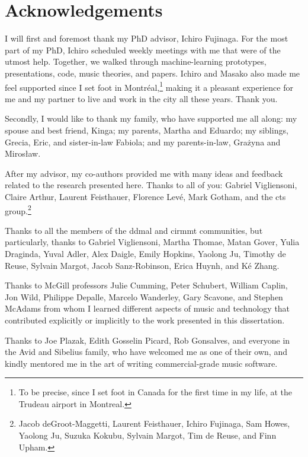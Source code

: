 \chapter*{Acknowledgements}
\label{chap:acknowledgements}

I will first and foremost thank my PhD advisor, Ichiro
Fujinaga. For the most part of my PhD, Ichiro scheduled
weekly meetings with me that were of the utmost help.
Together, we walked through machine-learning prototypes,
presentations, code, music theories, and papers. Ichiro and
Masako also made me feel supported since I set foot in
Montr\'eal,\footnote{To be precise, since I set foot in
Canada for the first time in my life, at the Trudeau airport
in Montreal.} making it a pleasant experience for me and my
partner to live and work in the city all these years. Thank
you.

Secondly, I would like to thank my family, who have
supported me all along: my spouse and best friend, Kinga; my
parents, Martha and Eduardo; my siblings, Grecia, Eric, and
sister-in-law Fabiola; and my parents-in-law, Gra\.zyna and
Miros\l{}aw.

After my advisor, my co-authors provided me with many ideas
and feedback related to the research presented here. Thanks
to all of you: Gabriel Vigliensoni, Claire Arthur, Laurent
Feisthauer, Florence Lev\'e, Mark Gotham, and the \gls{cts}
group.\footnote{Jacob deGroot-Maggetti, Laurent Feisthauer,
Ichiro Fujinaga, Sam Howes, Yaolong Ju, Suzuka Kokubu,
Sylvain Margot, Tim de Reuse, and Finn Upham.}

Thanks to all the members of the \gls{ddmal} and
\gls{cirmmt} communities, but particularly, thanks to
Gabriel Vigliensoni, Martha Thomae, Matan Gover, Yulia
Draginda, Yuval Adler, Alex Daigle, Emily Hopkins, Yaolong
Ju, Timothy de Reuse, Sylvain Margot, Jacob Sanz-Robinson,
Erica Huynh, and K\'e Zhang.

Thanks to McGill professors Julie Cumming, Peter Schubert,
William Caplin, Jon Wild, Philippe Depalle, Marcelo
Wanderley, Gary Scavone, and Stephen McAdams from whom I
learned different aspects of music and technology that
contributed explicitly or implicitly to the work presented
in this dissertation.

Thanks to Joe Plazak, Edith Gosselin Picard, Rob Gonsalves,
and everyone in the Avid and Sibelius family, who have
welcomed me as one of their own, and kindly mentored me in
the art of writing commercial-grade music software.

